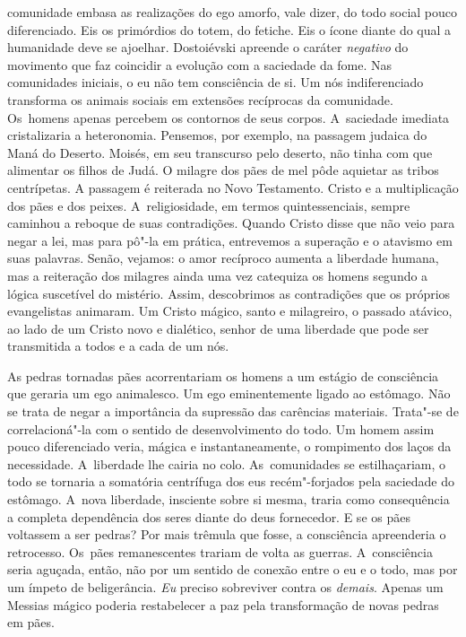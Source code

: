 comunidade embasa as realizações do ego amorfo, vale dizer, do todo
social pouco diferenciado. Eis os primórdios do totem, do fetiche. Eis o
ícone diante do qual a humanidade deve se ajoelhar. Dostoiévski apreende
o caráter \emph{negativo} do movimento que faz coincidir a evolução com
a saciedade da fome. Nas comunidades iniciais, o eu não tem consciência
de si. Um nós indiferenciado transforma os animais sociais em extensões
recíprocas da comunidade. Os~homens apenas percebem os contornos de seus
corpos. A~saciedade imediata cristalizaria a heteronomia. Pensemos, por
exemplo, na passagem judaica do Maná do Deserto. Moisés, em seu
transcurso pelo deserto, não tinha com que alimentar os filhos de Judá.
O milagre dos pães de mel pôde aquietar as tribos centrípetas. A
passagem é reiterada no Novo Testamento. Cristo e a multiplicação dos
pães e dos peixes. A~religiosidade, em termos quintessenciais, sempre
caminhou a reboque de suas contradições. Quando Cristo disse que não
veio para negar a lei, mas para pô"-la em prática, entrevemos a superação
e o atavismo em suas palavras. Senão, vejamos: o amor recíproco aumenta
a liberdade humana, mas a reiteração dos milagres ainda uma vez
catequiza os homens segundo a lógica suscetível do mistério. Assim,
descobrimos as contradições que os próprios evangelistas animaram. Um
Cristo mágico, santo e milagreiro, o passado atávico, ao lado de um
Cristo novo e dialético, senhor de uma liberdade que pode ser
transmitida a todos e a cada de um nós.

As pedras tornadas pães acorrentariam os homens a um estágio de
consciência que geraria um ego animalesco. Um ego eminentemente ligado
ao estômago. Não se trata de negar a importância da supressão das
carências materiais. Trata"-se de correlacioná"-la com o sentido de
desenvolvimento do todo. Um homem assim pouco diferenciado veria, mágica
e instantaneamente, o rompimento dos laços da necessidade. A~liberdade
lhe cairia no colo. As~comunidades se estilhaçariam, o todo se tornaria
a somatória centrífuga dos eus recém"-forjados pela saciedade do
estômago. A~nova liberdade, insciente sobre si mesma, traria como
consequência a completa dependência dos seres diante do deus fornecedor.
E se os pães voltassem a ser pedras? Por mais trêmula que fosse, a
consciência apreenderia o retrocesso. Os~pães remanescentes trariam de
volta as guerras. A~consciência seria aguçada, então, não por um sentido
de conexão entre o eu e o todo, mas por um ímpeto de beligerância.
\emph{Eu} preciso sobreviver contra os \emph{demais}. Apenas um Messias
mágico poderia restabelecer a paz pela transformação de novas pedras em
pães.

